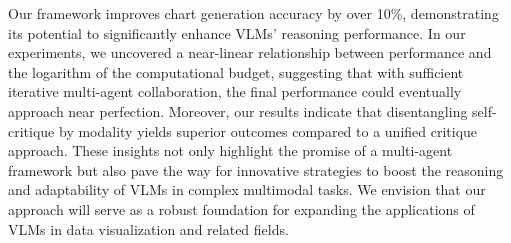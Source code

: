 Our framework improves chart generation accuracy by over 10\%, demonstrating its potential to significantly enhance VLMs' reasoning performance. 
In our experiments, we uncovered a near-linear relationship between performance and the logarithm of the computational budget, suggesting that with sufficient iterative multi-agent collaboration, the final performance could eventually approach near perfection. 
Moreover, our results indicate that disentangling self-critique by modality yields superior outcomes compared to a unified critique approach. 
These insights not only highlight the promise of a multi-agent framework but also pave the way for innovative strategies to boost the reasoning and adaptability of VLMs in complex multimodal tasks.
We envision that our approach will serve as a robust foundation for expanding the applications of VLMs in data visualization and related fields. 








